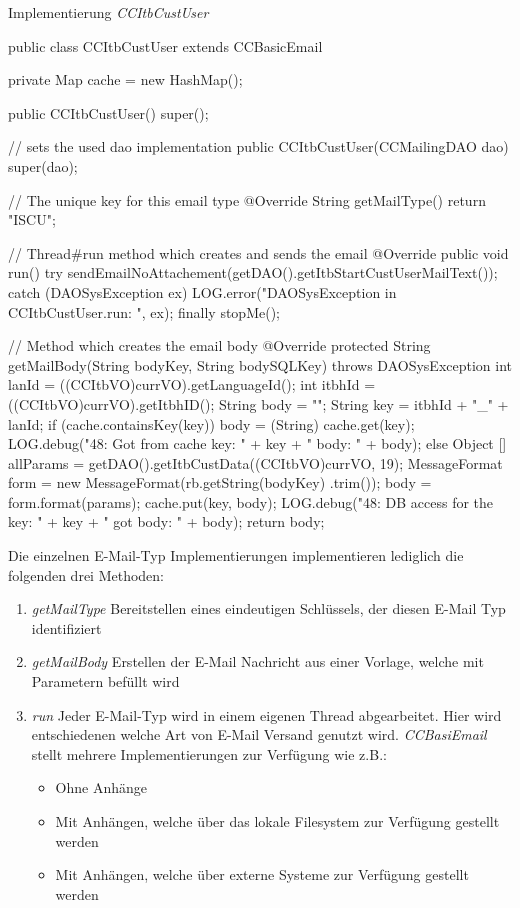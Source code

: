 \begin{program}
\caption{Implementierung \emph{CCItbCustUser}}
\label{CCItbCustUser.java}
\begin{JavaCode}
public class CCItbCustUser extends CCBasicEmail {
	
	private Map cache = new HashMap();

	public CCItbCustUser() {
		super();
	}
	
	// sets the used dao implementation
	public CCItbCustUser(CCMailingDAO dao) {
		super(dao);
	}

	// The unique key for this email type
	@Override
	String getMailType() {
		return "ISCU";
	}	
	
	// Thread\#run method which creates and sends the email
	@Override
	public void run() {
		try {
			sendEmailNoAttachement(getDAO().getItbStartCustUserMailText());
		} catch (DAOSysException ex) {
			LOG.error("DAOSysException in CCItbCustUser.run: ",
					   ex);
		} finally {
			stopMe();
		}
	}	
	
	// Method which creates the email body
	@Override
	protected String getMailBody(String bodyKey, String bodySQLKey)
		throws DAOSysException {
		int lanId = ((CCItbVO)currVO).getLanguageId();
		int itbhId = ((CCItbVO)currVO).getItbhID();
		String body = "";
		String key = itbhId	+ "_" + lanId;
		if (cache.containsKey(key)) {
			body = (String) cache.get(key);
			LOG.debug("48: Got from cache key: " + key 
					  + " body: " + body);
		} else {
			Object [] allParams = getDAO().getItbCustData((CCItbVO)currVO, 19);
			MessageFormat form = new MessageFormat(rb.getString(bodyKey)
			                                         .trim());
	 		body = form.format(params);
	 		cache.put(key, body);
	 		LOG.debug("48: DB access for the key: " + key
	 				+ " got body: " + body);
		}
		return body;
	}
}
\end{JavaCode}
\end{program}
\newpage
Die einzelnen E-Mail-Typ Implementierungen implementieren lediglich die folgenden drei Methoden:
\begin{enumerate}
	\item\emph{getMailType}
	\newline
	Bereitstellen eines eindeutigen Schlüssels, der diesen E-Mail Typ identifiziert
	\item\emph{getMailBody}
	\newline
	Erstellen der E-Mail Nachricht aus einer Vorlage, welche mit Parametern befüllt wird
	\item\emph{run}
	\newline
	Jeder E-Mail-Typ wird in einem eigenen Thread abgearbeitet. Hier wird entschiedenen welche Art von E-Mail Versand genutzt wird. \emph{CCBasiEmail} stellt mehrere Implementierungen zur Verfügung wie z.B.:
	\begin{itemize}
		\item Ohne Anhänge
		\item Mit Anhängen, welche über das lokale Filesystem zur Verfügung gestellt werden
		\item Mit Anhängen, welche über externe Systeme zur Verfügung gestellt werden
	\end{itemize}
\end{enumerate}
